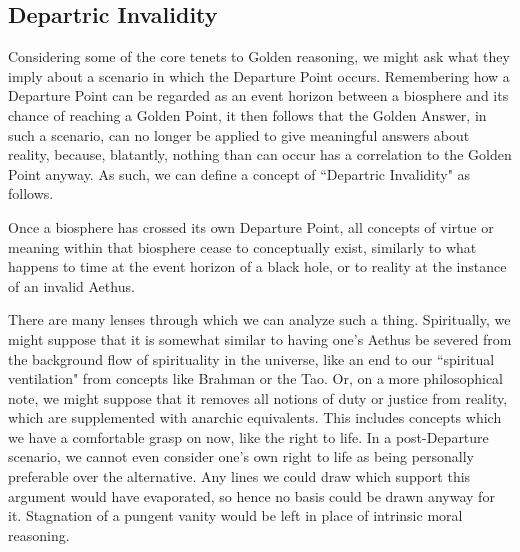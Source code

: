 \subsection{Departric Invalidity}

Considering some of the core tenets to Golden reasoning, we might ask what they imply about a scenario in which the Departure Point occurs. Remembering how a Departure Point can be regarded as an event horizon between a biosphere and its chance of reaching a Golden Point, it then follows that the Golden Answer, in such a scenario, can no longer be applied to give meaningful answers about reality, because, blatantly, nothing than can occur has a correlation to the Golden Point anyway. As such, we can define a concept of ``Departric Invalidity" as follows.
\begin{definition}
    Once a biosphere has crossed its own Departure Point, all concepts of virtue or meaning within that biosphere cease to conceptually exist, similarly to what happens to time at the event horizon of a black hole, or to reality at the instance of an invalid Aethus. 
\end{definition}
There are many lenses through which we can analyze such a thing. Spiritually, we might suppose that it is somewhat similar to having one's Aethus be severed from the background flow of spirituality in the universe, like an end to our ``spiritual ventilation" from concepts like Brahman or the Tao. Or, on a more philosophical note, we might suppose that it removes all notions of duty or justice from reality, which are supplemented with anarchic equivalents. This includes concepts which we have a comfortable grasp on now, like the right to life. In a post-Departure scenario, we cannot even consider one's own right to life as being personally preferable over the alternative. Any lines we could draw which support this argument would have evaporated, so hence no basis could be drawn anyway for it. Stagnation of a pungent vanity would be left in place of intrinsic moral reasoning. 

